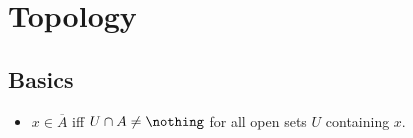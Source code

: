 \documentclass{article}
\begin{document}
%
%
%


\section{Topology}

\subsection{Basics}
\begin{itemize}
    \item \(x \in \overline{A}\) iff \(U\cap A \neq \nothing\) for all open sets \(U\) containing \(x\).
\end{itemize}
    
\end{document}

